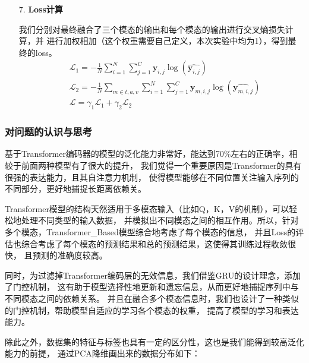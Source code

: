 \documentclass[11pt]{article}
\begin{document}
\begin{enumerate}
                \item [7. ]\textbf{Loss计算}\par
                我们分别对最终融合了三个模态的输出和每个模态的输出进行交叉熵损失计算，并
                进行加权相加（这个权重需要自己定义，本次实验中均为1），得到最终的loss。
                \begin{align}
                    &\mathcal{L}_1 = -\frac{1}{N}\sum_{i = 1}^{N}\sum_{j = 1}^{C}\textbf{y}_{i, j}\log(\hat{\textbf{y}_{i, j}})\\
                    &\mathcal{L}_2 = -\frac{1}{N}\sum_{m \in {t,a,v}}\sum_{i = 1}^{N}\sum_{j = 1}^{C}\textbf{y}_{m, i, j}\log(\hat{\textbf{y}_{m, i, j}})\\
                    &\mathcal{L}=\gamma_1\mathcal{L}_1 + \gamma_2\mathcal{L}_2
                \end{align}
                
            \end{enumerate}

            \subsubsection{对问题的认识与思考}
            基于Transformer编码器的模型的泛化能力非常好，能达到70\%左右的正确率，相较于前面两种模型有了很大的提升，
            我们觉得一个重要原因是Transformer的具有很强的表达能力，且其自注意力机制，
            使得模型能够在不同位置关注输入序列的不同部分，更好地捕捉长距离依赖关。
            
            Transformer模型的结构天然适用于多模态输入（比如Q，K，V的机制），可以轻松地处理不同类型的输入数据，
            并模拟出不同模态之间的相互作用。所以，针对多个模态，Transformer\_Based模型综合地考虑了每个模态的信息，
            并且Loss的评估也综合考虑了每个模态的预测结果和总的预测结果，这使得其训练过程收敛很快，
            且预测的准确度较高。
            
            同时，为过滤掉Transformer编码层的无效信息，我们借鉴GRU的设计理念，添加了门控机制，
            这有助于模型选择性地更新和遗忘信息，从而更好地捕捉序列中与不同模态之间的依赖关系。
            并且在融合多个模态信息时，我们也设计了一种类似的门控机制，帮助模型自适应的学习各个模态的权重，
            提高了模型的学习和表达能力。
            
            除此之外，数据集的特征与标签也具有一定的区分性，这也是我们能得到较高泛化能力的前提，
            通过PCA降维画出来的数据分布如下：
\end{document}
